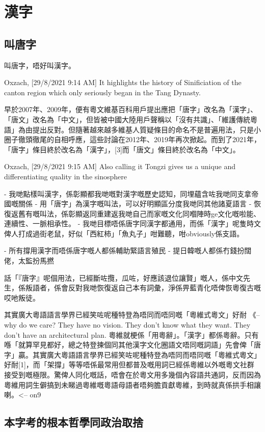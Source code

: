 \chapter{漢字}


\section{叫唐字}
叫唐字，唔好叫漢字。

Oxzach, [29/8/2021 9:14 AM]
It highlights the history of Sinificiation of the canton region which only seriously began in the Tang Dynasty.

早於2007年、2009年，便有粵文維基百科用戶提出應把「唐字」改名為「漢字」、「唐文」改名為「中文」，但皆被中國大陸用戶聲稱以「沒有共識」、「維護傳統粵語」為由提出反對。但隨著越來越多維基人質疑條目的命名不是普遍用法，只是小圈子徹頭徹尾的自相呼應，這些討論在2012年、2019年再次掀起。而到了2021年，「唐字」條目終於改名為「漢字」，[3]而「唐文」條目終於改名為「中文」。

Oxzach, [29/8/2021 9:15 AM]
Also calling it Tongzi gives us a unique and differentiating quality in the sinosphere


- 我哋點樣叫漢字，係彰顯都我哋嘅對漢字嘅歷史認知，同埋蘊含咗我哋同支拿帝國嘅關係
- 用「唐字」為漢字嘅叫法，可以好明顯區分度我哋同其他諸夏語言
- 恢復返舊有嘅叫法，係彰顯返同重建返我哋自己而家嘅文化同嗰陣時ge文化嘅啦能、連續性、一脈相承性。
- 我哋目標唔係唐字同漢字都通用，而係「漢字」呢隻時文俾人打成過街老鼠，好似「西紅柿」「魚丸子」咁難聽，咁obviously係支語。

- 所有撐用漢字而唔係唐字嘅人都係輔助緊語言殖民
- 提日韓嘅人都係冇錢扮闊佬，太監扮馬撚

話「『唐字』呢個用法，已經斷咗攬，瓜咗，好應該退位讓賢」嘅人，係中文先生，係叛語者，係會反對我哋恢復返自己本有詞彙，淨係畀藍青化唔俾恢粵復古嘅哎吔叛徒。

其實廣大粵語語言學界已經笑咗呢種特登為唔同而唔同嘅「粵維式粵文」好耐 《-- why do we care? They have no vision. They don't know what they want. They don't have an architectural plan.
粵維就梗係「用粵辭」。「漢字」都係粵辭。只有喺「就算罕見都好，總之特登揀個同其他漢字文化圈語文唔同嘅詞語」先會俾「唐字」贏。其實廣大粵語語言學界已經笑咗呢種特登為唔同而唔同嘅「粵維式粵文」好耐[1]，而「架撐」等等唔係最常用但都普及嘅用詞已經係粵維以外嘅粵文社群接受到嘅極限。驚俾人同化嘅話，唔會在於粵文用多幾個內容語共通詞，反而因為粵維用詞生僻搞到未睇過粵維嘅粵語母語者唔夠膽貢獻粵維，到時就真係拱手相讓喇。<-- on9



\section{本字考的根本哲學同政治取捨}

